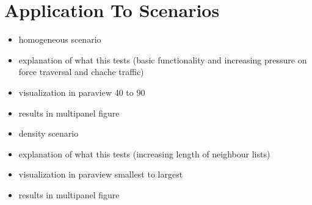 \chapter{Application To Scenarios}
\label{ch:application_to_scenarios}

\begin{itemize}
    \begin{itemize}
        \item homogeneous scenario
        \item explanation of what this tests (basic functionality and increasing pressure on force traversal and chache traffic)
        \item visualization in paraview 40 to 90
        \item results in multipanel figure
    \end{itemize}
    \begin{itemize}
        \item density scenario
        \item explanation of what this tests (increasing length of neighbour lists)
        \item visualization in paraview smallest to largest
        \item results in multipanel figure
    \end{itemize}
\end{itemize}


